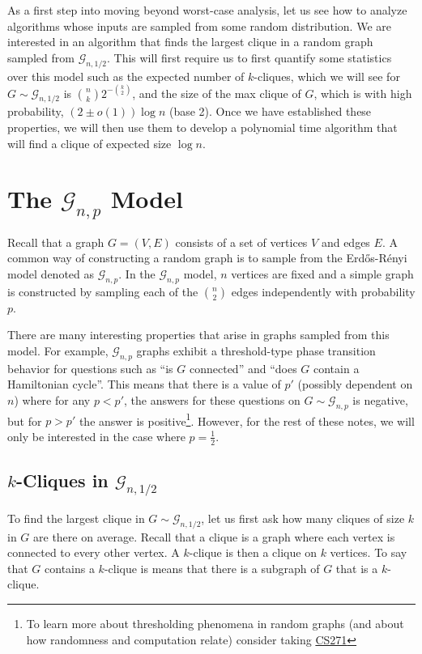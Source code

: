 \documentclass{article}
\begin{document}

As a first step into moving beyond worst-case analysis, let us see how to analyze algorithms 
whose inputs are sampled from some random distribution. We are interested in an
algorithm that finds the largest clique in a random graph sampled from
$\mathcal{G}_{n, 1/2}$. This will first require us to first quantify some
statistics over this model such as the expected number of $k$-cliques, which we
will see for $G \sim \mathcal{G}_{n, 1/2}$ is $\binom{n}{k} 2^{-\binom{k}{2}}$,
and the size of the max clique of $G$, which is with high probability, $(2 \pm o(1)) \log{n}$ (base 2). Once we have established these properties, we will then use them to develop a polynomial time algorithm that will find a clique of expected size $\log{n}$.

\section{The $\mathcal{G}_{n,p}$ Model}

Recall that a graph $G = (V, E)$ consists of a set of vertices $V$ and edges $E$. A common way of constructing a random graph is to sample from the Erd\H{o}s-R\'enyi model denoted as $\mathcal{G}_{n, p}$. In the $\mathcal{G}_{n, p}$ model, $n$ vertices are fixed and a simple graph is constructed by sampling each of the $\binom{n}{2}$ edges independently with probability $p$.

There are many interesting properties that arise in graphs sampled from this
model. For example, $\mathcal{G}_{n,p}$ graphs exhibit a threshold-type phase
transition behavior for questions such as ``is $G$ connected'' and ``does $G$ contain a Hamiltonian cycle''. This means that there is a value of $p'$ (possibly dependent on $n$) where for any $p < p'$, the answers for these questions on $G \sim \mathcal{G}_{n,p}$ is negative, but for $p > p'$ the answer is positive\footnote{To learn more about thresholding phenomena in random graphs (and about how randomness and computation relate) consider taking \href{https://people.eecs.berkeley.edu/~sinclair/cs271/s18.html}{CS271}}. However, for the rest of these notes, we will only be interested in the case where $p = \frac{1}{2}$.

\subsection{$k$-Cliques in $\mathcal{G}_{n, 1/2}$}
To find the largest clique in $G \sim \mathcal{G}_{n, 1/2}$, let us first ask how many cliques of size $k$ in $G$ are there on average. Recall that a clique is a graph where each vertex is connected to every other vertex. A $k$-clique is then a clique on $k$ vertices. To say that $G$ contains a $k$-clique is means that there is a subgraph of $G$ that is a $k$-clique.
\end{document}
